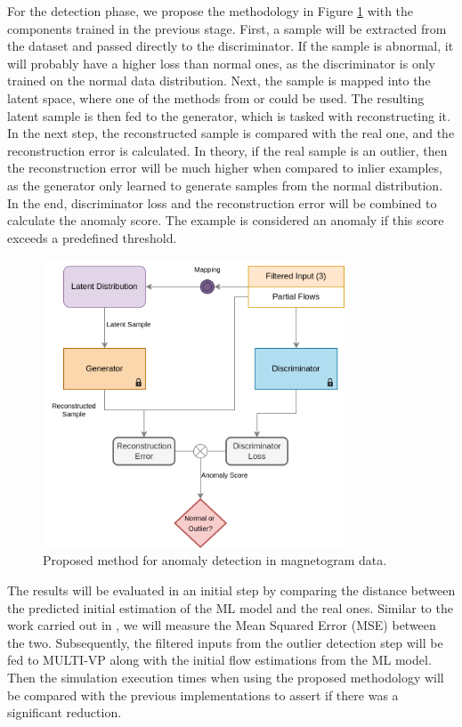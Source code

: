 For the detection phase, we propose the methodology in Figure \ref{fig:proposed_gan_arch} with the components trained in the previous stage. First, a sample will be extracted from the dataset and passed directly to the discriminator. If the sample is abnormal, it will probably have a higher loss than normal ones, as the discriminator is only trained on the normal data distribution. Next, the sample is mapped into the latent space, where one of the methods from \cite{li.etal_MADGANMultivariateAnomaly_2019} or \cite{bashar.nayak_TAnoGANTimeSeries_2020} could be used. The resulting latent sample is then fed to the generator, which is tasked with reconstructing it. In the next step, the reconstructed sample is compared with the real one, and the reconstruction error is calculated. In theory, if the real sample is an outlier, then the reconstruction error will be much higher when compared to inlier examples, as the generator only learned to generate samples from the normal distribution. In the end, discriminator loss and the reconstruction error will be combined to calculate the anomaly score. The example is considered an anomaly if this score exceeds a predefined threshold.

\begin{figure}[ht]
\centering
\includegraphics[width=0.8\textwidth]{figures/proposed_gan_arch.png}
\caption{Proposed method for anomaly detection in magnetogram data.}
\label{fig:proposed_gan_arch}
\end{figure}


The results will be evaluated in an initial step by comparing the distance between the predicted initial estimation of the ML model and the real ones. Similar to the work carried out in \cite{barros_InitialConditionEstimation_}, we will measure the Mean Squared Error (MSE) between the two. Subsequently, the filtered inputs from the outlier detection step will be fed to MULTI-VP along with the initial flow estimations from the ML model. Then the simulation execution times when using the proposed methodology will be compared with the previous implementations to assert if there was a significant reduction.

